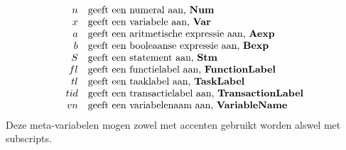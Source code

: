 \begin{equation*}
\begin{array}{rl}
  	n  & \textrm{geeft een \Index{numeral} aan, \syncat{Num}} \\
	x  & \textrm{geeft een \Index{variabele} aan, \syncat{Var}} \\
	a  & \textrm{geeft een \Index{aritmetische expressie} aan, \syncat{Aexp}} \\
	b  & \textrm{geeft een \Index{booleaanse expressie} aan, \syncat{Bexp}} \\
	S  & \textrm{geeft een \Index{statement} aan, \syncat{Stm}} \\
	fl & \textrm{geeft een \Index{functielabel} aan, \syncat{FunctionLabel}} \\
	tl & \textrm{geeft een \Index{taaklabel} aan, \syncat{TaskLabel}} \\
	tid& \textrm{geeft een \Index{transactielabel} aan, \syncat{TransactionLabel}} \\
	vn & \textrm{geeft een \Index{variabelenaam} aan, \syncat{VariableName}}
\end{array}
\end{equation*}
Deze meta-variabelen mogen zowel met accenten gebruikt worden alswel met subscripts.

